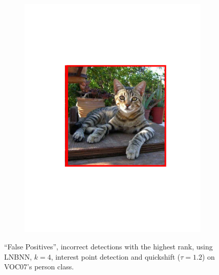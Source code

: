 \begin{figure}[hbt]
\begin{subfigure}[b]{0.45\textwidth}
        \includegraphics[width=\textwidth]{FP4}
        \caption{}
        \label{fig:detfp4}
    \end{subfigure}
    \caption{``False Positives'', incorrect detections with the highest rank, using LNBNN, $k=4$, interest point detection and quickshift ($\tau=1.2$) on VOC07's person class.}
    \label{fig:detfp}
\end{figure}

